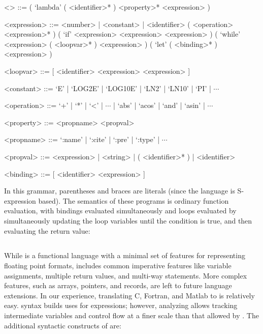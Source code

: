 \documentclass[main.tex]{subfiles}
\begin{document}
\begin{grammar}
<\core> ::= ( `lambda' ( <identifier>* ) <property>* <expression> )

<expression> ::= <number> | <constant> | <identifier>
\alt ( <operation> <expression>* )
\alt ( `if' <expression> <expression> <expression> )
\alt ( `while' <expression> ( <loopvar>* ) <expression> )
\alt ( `let' ( <binding>* ) <expression> )

<loopvar> ::= [ <identifier> <expression> <expression> ]

<constant> ::= `E' | `LOG2E' | `LOG10E' | `LN2' | `LN10' | `PI' | $\dotsb$

<operation> ::= `+' | `*' | `<' | $\dotsb$ | `abs' | `acos' | `and' | `asin' | $\dotsb$

<property> ::= <propname> <propval>

<propname> ::= `:name' | `:cite' | `:pre' | `:type' | $\dotsb$

<propval> ::= <expression> | <string> | ( <identifier>* ) | <identifier>

<binding> ::= [ <identifier> <expression> ]
\end{grammar}

In this grammar, parentheses and braces are literals
  (since the language is S-expression based).
The semantics of these programs is ordinary function evaluation,
  with  bindings evaluated simultaneously
  and  loops evaluated
  by simultaneously updating the loop variables
  until the condition is true,
  and then evaluating the return value:

\begin{mathpar}

\end{mathpar}

\subsection{\surface}

While \core is a functional language
  with a minimal set of features
  for representing floating point formats,
  \surface includes common imperative features
  like variable assignments,
  multiple return values,
  and multi-way  statements.
More complex features,
  such as arrays, pointers, and records,
  are left to future language extensions.
In our experience,
  translating C, Fortran, and Matlab to \surface is relatively easy.
\surface syntax builds uses \core for expressions;
  however, analyzing \surface allows tracking intermediate variables
  and control flow at a finer scale than that allowed by \core.
The additional syntactic constructs of \surface are:
\end{document}
